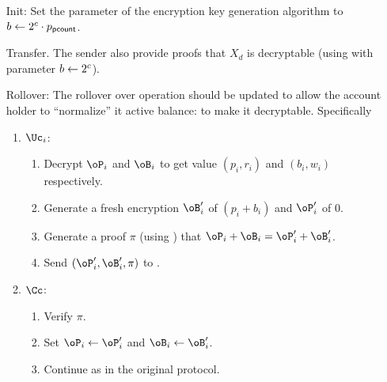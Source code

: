 \begin{enumerate}
	
	\item[Init:] Set the parameter of the encryption key generation algorithm to  $b \leftarrow 2^{c}\cdot p_{\mathsf{pcount}}$.
	 
	\item[Transfer.]  The sender also provide proofs that $X_d$ is decryptable (\ie using \pZK{\rDec} with parameter $b\leftarrow 2^c$).
	
	
	\item[Rollover:] The rollover over operation should be updated to allow the account holder to ``normalize''  it active balance: to make it decryptable. Specifically
	
	\begin{enumerate}
		\item $\Uc_i$:
		
		\begin{enumerate}
			\item Decrypt $\oP_i$ and $\oB_i$ to get value $(p_i,r_i)$ and $(b_i,w_i)$ respectively.
			
			
			\item Generate a fresh  encryption $\oB_i'$ of $(p_i +b_i )$ and $\oP_i'$ of $0$.
			
			\item Generate a proof $\pi$ (\ie using \pZK{\rEq})   that $\oP_i+\oB_i = \oP_i'+ \oB_i'$.
			
			\item Send $(\oP_i',\oB_i',\pi)$ to \Cc.
		
		\end{enumerate}
		
		\item $\Cc$:
			\begin{enumerate}
				\item Verify $\pi$.
				
				\item Set $\oP_i  \asn \oP_i'$  and $\oB_i  \asn \oB_i'$.
				
				\item Continue as in the original protocol.
			\end{enumerate}
		
	\end{enumerate}
\end{enumerate}